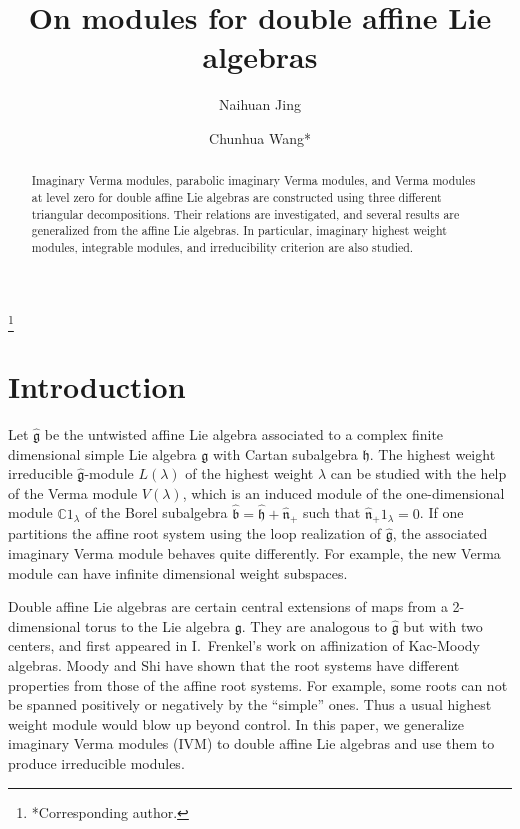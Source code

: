 \documentclass[11pt]{amsproc}
\theoremstyle{definition}
\theoremstyle{remark}
\numberwithin{equation}{section} \errorcontextlines=0
\begin{document}
\title[On modules for double affine Lie algebras]
{On modules for double affine Lie algebras}
\author{Naihuan Jing}
\address{School of Mathematical Sciences,
South China University of Technology, Guangzhou, Guangdong 510640, China and
Department of Mathematics,
   North Carolina State University,
   Raleigh, NC 27695, USA}
\author{Chunhua Wang*}
\address{School of Mathematical Sciences,
South China University of Technology, Guangzhou, Guangdong 510640, China}

\thanks{*Corresponding author.}

\begin{abstract}
Imaginary Verma modules, parabolic imaginary Verma modules,
and Verma modules at level zero for double affine Lie algebras are constructed
using three different triangular decompositions. Their relations are investigated,
and several results are generalized from the affine Lie algebras.
In particular, imaginary highest weight modules, integrable modules, and irreducibility criterion
are also studied.
\end{abstract}
\maketitle
\section{Introduction}

Let $\hat{\mathfrak{g}}$ be the untwisted affine Lie algebra
associated to a complex finite dimensional simple Lie algebra ${\mathfrak{g}}$
with Cartan subalgebra $\mathfrak{h}$.
The highest weight irreducible $\hat{\mathfrak{g}}$-module $L(\lambda)$
of the highest weight $\lambda$ can be studied with the help of the Verma module
$V(\lambda)$, which is an induced module
of the one-dimensional module $\mathbb C1_{\lambda}$ of the Borel subalgebra
$\hat{\mathfrak b}=\hat{\mathfrak{h}}+\hat{\mathfrak{n}}_+$
such that $\hat{\mathfrak{n}}_+1_\lambda=0$.
If one partitions the affine root system using the loop realization
 of $\hat{\mathfrak{g}}$, the associated imaginary Verma module \cite{F}
behaves quite differently. For example, the new Verma module can have infinite
dimensional weight subspaces.

Double affine Lie algebras are certain central extensions of maps
from a 2-dimensional torus to the Lie algebra ${\mathfrak{g}}$. They
are analogous to $\hat{\mathfrak g}$ but with two centers, and first
appeared in I.~Frenkel's work \cite{Fr} on affinization of Kac-Moody
algebras. Moody and Shi \cite{MS} have shown that the root systems
have different properties from those of the affine root systems. For
example, some roots can not be spanned positively or negatively by
the ``simple'' ones. Thus a usual highest weight module would blow
up beyond control. In this paper, we generalize imaginary Verma
modules (IVM) to double affine Lie algebras and use them to produce
irreducible modules.
\end{document}
